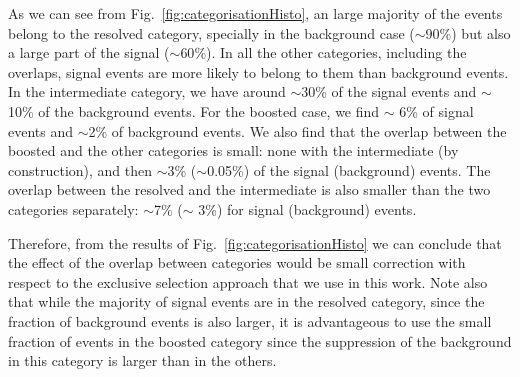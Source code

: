 As we can see from Fig.~\ref{fig:categorisationHisto}, an large majority of the events
belong to the resolved category, specially in the background case ($\sim 90\%$) but
also a large part of the signal ($\sim 60\%$).
%
In all the other categories, including
the overlaps, signal events are more likely to belong to them than
background events.
%
In the intermediate category, we have around $\sim$30\% of the signal
events and $\sim$10\% of the background events.
%
For the boosted case, we find $\sim$ 6\% of signal events and
$\sim$2\% of background events.
%
We also find that the overlap between the boosted and the other categories
is small: none with the intermediate (by construction), and then $\sim$3\%
($\sim$0.05\%) of the signal (background) events.
%
The overlap between the resolved and the intermediate is also smaller
than the two categories separately: $\sim$7\%
($\sim$ 3\%) for signal (background) events.

Therefore, from the results of Fig.~\ref{fig:categorisationHisto}
we can conclude that the effect of the overlap between categories would
be small correction with respect to the exclusive selection approach
that we use in this work.
%
Note also that while the majority of signal events are in the resolved
category, since the fraction of background events is also larger,
it is advantageous to use the small fraction of events in the boosted category
since the suppression of the background in this category is larger
than in the others.
